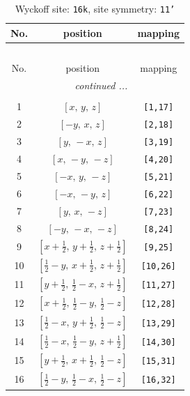 \documentclass[fleqn,8pt]{jsarticle}
\begin{document}
\begin{longtable}{ccc}
\caption{Wyckoff site: {\tt 16k}, site symmetry: {\tt 11'}}
 \\
 \hline \hline
No. & position & mapping \\ \hline \endfirsthead

\multicolumn{2}{l}{\tablename\ \thetable{}} \\
 \hline \hline
No. & position & mapping \\ \hline \endhead

 \hline \hline
\multicolumn{2}{r}{\footnotesize\it continued ...} \\ \endfoot

 \hline \hline
\multicolumn{2}{r}{} \\ \endlastfoot

1 & $\left[ x,\, y,\, z \right]$ & {\tt [1,17]} \\ \hline
2 & $\left[ - y,\, x,\, z \right]$ & {\tt [2,18]} \\ \hline
3 & $\left[ y,\, - x,\, z \right]$ & {\tt [3,19]} \\ \hline
4 & $\left[ x,\, - y,\, - z \right]$ & {\tt [4,20]} \\ \hline
5 & $\left[ - x,\, y,\, - z \right]$ & {\tt [5,21]} \\ \hline
6 & $\left[ - x,\, - y,\, z \right]$ & {\tt [6,22]} \\ \hline
7 & $\left[ y,\, x,\, - z \right]$ & {\tt [7,23]} \\ \hline
8 & $\left[ - y,\, - x,\, - z \right]$ & {\tt [8,24]} \\ \hline
9 & $\left[ x + \frac{1}{2},\, y + \frac{1}{2},\, z + \frac{1}{2} \right]$ & {\tt [9,25]} \\ \hline
10 & $\left[ \frac{1}{2} - y,\, x + \frac{1}{2},\, z + \frac{1}{2} \right]$ & {\tt [10,26]} \\ \hline
11 & $\left[ y + \frac{1}{2},\, \frac{1}{2} - x,\, z + \frac{1}{2} \right]$ & {\tt [11,27]} \\ \hline
12 & $\left[ x + \frac{1}{2},\, \frac{1}{2} - y,\, \frac{1}{2} - z \right]$ & {\tt [12,28]} \\ \hline
13 & $\left[ \frac{1}{2} - x,\, y + \frac{1}{2},\, \frac{1}{2} - z \right]$ & {\tt [13,29]} \\ \hline
14 & $\left[ \frac{1}{2} - x,\, \frac{1}{2} - y,\, z + \frac{1}{2} \right]$ & {\tt [14,30]} \\ \hline
15 & $\left[ y + \frac{1}{2},\, x + \frac{1}{2},\, \frac{1}{2} - z \right]$ & {\tt [15,31]} \\ \hline
16 & $\left[ \frac{1}{2} - y,\, \frac{1}{2} - x,\, \frac{1}{2} - z \right]$ & {\tt [16,32]} \\
\end{longtable}
\end{document}
